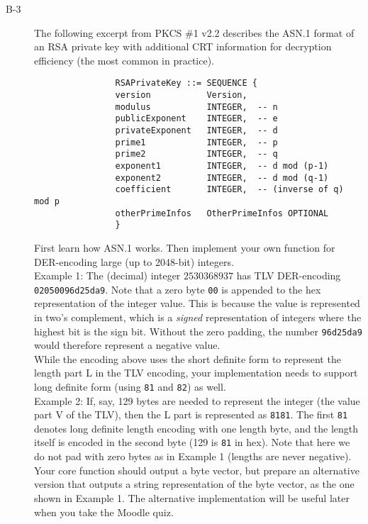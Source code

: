 \documentclass{article}
\begin{document}
\begin{description}
			\item[B-3]{The following excerpt from PKCS \#1 v2.2 describes the ASN.1 format of an RSA private key with additional CRT information for decryption efficiency (the most common in practice).
				\begin{verbatim}
				RSAPrivateKey ::= SEQUENCE {
				version           Version,
				modulus           INTEGER,  -- n
				publicExponent    INTEGER,  -- e
				privateExponent   INTEGER,  -- d
				prime1            INTEGER,  -- p
				prime2            INTEGER,  -- q
				exponent1         INTEGER,  -- d mod (p-1)
				exponent2         INTEGER,  -- d mod (q-1)
				coefficient       INTEGER,  -- (inverse of q) mod p
				otherPrimeInfos   OtherPrimeInfos OPTIONAL
				}
				\end{verbatim}
				First learn how ASN.1 works. Then implement your own function for DER-encoding large (up to 2048-bit) integers.\\
				
				Example 1: The (decimal) integer $2530368937$ has TLV DER-encoding \verb!02050096d25da9!. Note that a zero byte \verb!00! is appended to the hex representation of the integer value. This is because the value is represented in two's complement, which is a \textit{signed} representation of integers where the highest bit is the sign bit. Without the zero padding, the number \verb!96d25da9! would therefore represent a negative value.\\
				
				While the encoding above uses the short definite form to represent the length part L in the TLV encoding, your implementation needs to support long definite form (using \verb!81! and \verb!82!) as well.\\
				
				Example 2: If, say, 129 bytes are needed to represent the integer (the value part V of the TLV), then the L part is represented as \verb!8181!. The first \verb!81! denotes long definite length encoding with one length byte, and the length itself is encoded in the second byte (129 is \verb!81! in hex). Note that here we do not pad with zero bytes as in Example 1 (lengths are never negative).\\
				
				Your core function should output a byte vector, but prepare an alternative version that outputs a string representation of the byte vector, as the one shown in Example 1. The alternative implementation will be useful later when you take the Moodle quiz.
				
}
\end{description}
\end{document}
